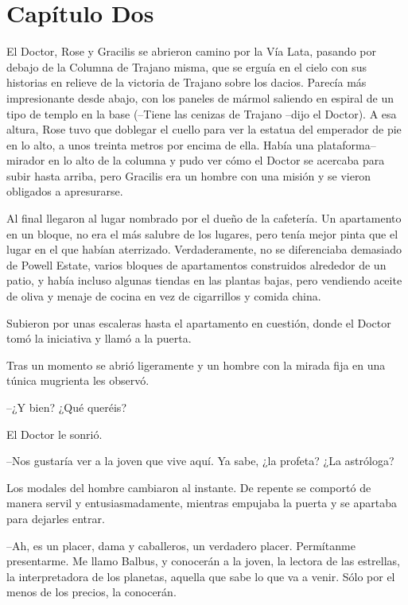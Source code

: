 \chapter*{Capítulo Dos}

El Doctor, Rose y Gracilis se abrieron camino por la Vía Lata, pasando
por debajo de la Columna de Trajano misma, que se erguía en el cielo con
sus historias en relieve de la victoria de Trajano sobre los dacios.
Parecía más impresionante desde abajo, con los paneles de mármol
saliendo en espiral de un tipo de templo en la base (--Tiene las cenizas
de Trajano --dijo el Doctor). A esa altura, Rose tuvo que doblegar el
cuello para ver la estatua del emperador de pie en lo alto, a unos
treinta metros por encima de ella. Había una plataforma--mirador en lo
alto de la columna y pudo ver cómo el Doctor se acercaba para subir
hasta arriba, pero Gracilis era un hombre con una misión y se vieron
obligados a apresurarse.

Al final llegaron al lugar nombrado por el dueño de la cafetería. Un
apartamento en un bloque, no era el más salubre de los lugares, pero
tenía mejor pinta que el lugar en el que habían aterrizado.
Verdaderamente, no se diferenciaba demasiado de Powell Estate, varios
bloques de apartamentos construidos alrededor de un patio, y había
incluso algunas tiendas en las plantas bajas, pero vendiendo aceite de
oliva y menaje de cocina en vez de cigarrillos y comida china.

Subieron por unas escaleras hasta el apartamento en cuestión, donde el
Doctor tomó la iniciativa y llamó a la puerta.

Tras un momento se abrió ligeramente y un hombre con la mirada fija en
una túnica mugrienta les observó.

--¿Y bien? ¿Qué queréis?

El Doctor le sonrió.

--Nos gustaría ver a la joven que vive aquí. Ya sabe, ¿la profeta? ¿La
astróloga?

Los modales del hombre cambiaron al instante. De repente se comportó de
manera servil y entusiasmadamente, mientras empujaba la puerta y se
apartaba para dejarles entrar.

--Ah, es un placer, dama y caballeros, un verdadero placer. Permítanme
presentarme. Me llamo Balbus, y conocerán a la joven, la lectora de las
estrellas, la interpretadora de los planetas, aquella que sabe lo que va
a venir. Sólo por el menos de los precios, la conocerán.

